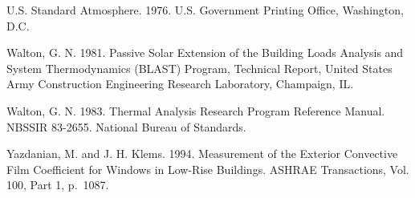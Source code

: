 U.S. Standard Atmosphere. 1976. U.S. Government Printing Office, Washington, D.C.

Walton, G. N. 1981. Passive Solar Extension of the Building Loads Analysis and System Thermodynamics (BLAST) Program, Technical Report, United States Army Construction Engineering Research Laboratory, Champaign, IL.

Walton, G. N. 1983. Thermal Analysis Research Program Reference Manual. NBSSIR 83-2655. National Bureau of Standards.

Yazdanian, M. and J. H. Klems. 1994. Measurement of the Exterior Convective Film Coefficient for Windows in Low-Rise Buildings. ASHRAE Transactions, Vol. 100, Part 1, p.~1087.
